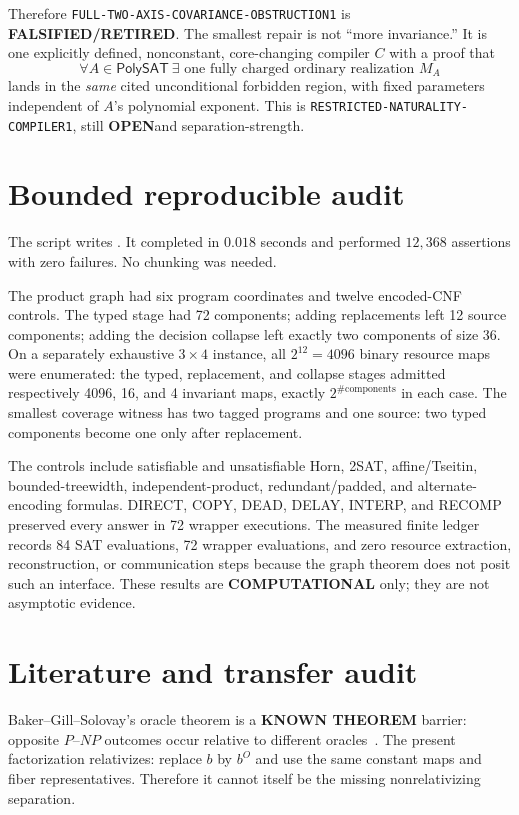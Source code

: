 \documentclass[11pt]{article}
\newcommand{\PolySAT}{\mathsf{PolySAT}}
\newcommand{\KNOWN}{\textbf{KNOWN THEOREM}}
\newcommand{\COMP}{\textbf{COMPUTATIONAL}}
\newcommand{\OPEN}{\textbf{OPEN}}
\newcommand{\RETIRED}{\textbf{FALSIFIED/RETIRED}}
\begin{document}
Therefore \texttt{FULL-TWO-AXIS-COVARIANCE-OBSTRUCTION1} is \RETIRED.  The
smallest repair is not ``more invariance.''  It is one explicitly defined,
nonconstant, core-changing compiler $C$ with a proof that
\[
 \forall A\in\PolySAT\ \exists\text{ one fully charged ordinary
 realization }M_A
\]
lands in the \emph{same} cited unconditional forbidden region, with fixed
parameters independent of $A$'s polynomial exponent.  This is
\texttt{RESTRICTED-NATURALITY-COMPILER1}, still \OPEN and separation-strength.

\section{Bounded reproducible audit}

The script
writes
.
It completed in $0.018$ seconds and performed $12{,}368$ assertions with zero
failures.  No chunking was needed.

The product graph had six program coordinates and twelve encoded-CNF controls.
The typed stage had 72 components; adding replacements left 12 source
components; adding the decision collapse left exactly two components of size
36.  On a separately exhaustive $3\times4$ instance, all $2^{12}=4096$
binary resource maps were enumerated: the typed, replacement, and collapse
stages admitted respectively 4096, 16, and 4 invariant maps, exactly
$2^{\#\mathrm{components}}$ in each case.  The smallest coverage witness has
two tagged programs and one source: two typed components become one only after
replacement.

The controls include satisfiable and unsatisfiable Horn, 2SAT,
affine/Tseitin, bounded-treewidth, independent-product, redundant/padded, and
alternate-encoding formulas.  DIRECT, COPY, DEAD, DELAY, INTERP, and RECOMP
preserved every answer in 72 wrapper executions.  The measured finite ledger
records 84 SAT evaluations, 72 wrapper evaluations, and zero resource
extraction, reconstruction, or communication steps because the graph theorem
does not posit such an interface.  These results are \COMP{} only; they are
not asymptotic evidence.

\section{Literature and transfer audit}

Baker--Gill--Solovay's oracle theorem is a \KNOWN{} barrier: opposite
$P$--$NP$ outcomes occur relative to different oracles~\cite{BGS75}.  The
present factorization relativizes: replace $b$ by $b^O$ and use the same
constant maps and fiber representatives.  Therefore it cannot itself be the
missing nonrelativizing separation.
\end{document}
